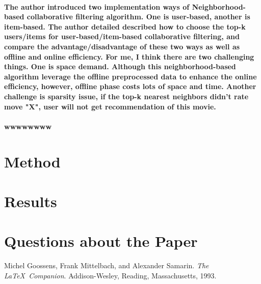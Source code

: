\documentclass{article}
\begin{document}
\paragraph{The author introduced two implementation ways of Neighborhood-based collaborative filtering algorithm. One is user-based, another is item-based. The author detailed described how to choose the top-k users/items for user-based/item-based collaborative filtering, and compare the advantage/disadvantage of these two ways as well as offline and online efficiency. For me, I think there are two challenging things. One is space demand. Although this neighborhood-based algorithm leverage the offline preprocessed data to enhance the online efficiency, however, offline phase costs lots of space and time. Another challenge is sparsity issue, if the top-k nearest neighbors didn't rate move "X", user will not get recommendation of this movie.  
}
\paragraph{wwwwwwww}
\section{Method}
\section{Results}
\section{Questions about the Paper}


\begin{thebibliography}{1}
Michel Goossens, Frank Mittelbach, and Alexander Samarin. 
\textit{The \LaTeX\ Companion}. 
Addison-Wesley, Reading, Massachusetts, 1993.
 
\end{thebibliography}
\end{document}

